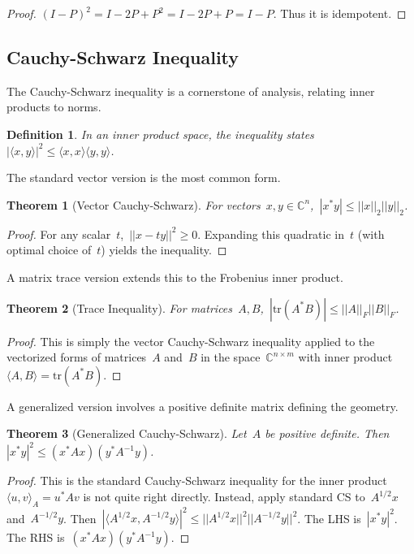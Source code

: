 \documentclass[12pt]{article}
\newtheorem{theorem}{Theorem}[section]
\newtheorem{definition}{Definition}[section]
\begin{document}
\begin{proof}
    $(I - P)^2 = I - 2P + P^2 = I - 2P + P = I - P$. Thus it is idempotent.
\end{proof}

\subsection{Cauchy-Schwarz Inequality}

The Cauchy-Schwarz inequality is a cornerstone of analysis, relating inner products to norms.

\begin{definition}
    In an inner product space, the inequality states~$|\langle x, y \rangle|^2 \le \langle x, x \rangle \langle y, y \rangle$.
\end{definition}

The standard vector version is the most common form.

\begin{theorem}[Vector Cauchy-Schwarz]
    For vectors~$x, y \in \mathbb{C}^n$,~$|x^* y| \le ||x||_2 ||y||_2$.
\end{theorem}

\begin{proof}
    For any scalar~$t$,~$||x - ty||^2 \ge 0$. Expanding this quadratic in~$t$ (with optimal choice of~$t$) yields the inequality.
\end{proof}

A matrix trace version extends this to the Frobenius inner product.

\begin{theorem}[Trace Inequality]
    For matrices~$A, B$,~$|\text{tr}(A^* B)| \le ||A||_F ||B||_F$.
\end{theorem}

\begin{proof}
    This is simply the vector Cauchy-Schwarz inequality applied to the vectorized forms of matrices~$A$ and~$B$ in the space~$\mathbb{C}^{n \times m}$ with inner product~$\langle A, B \rangle = \text{tr}(A^* B)$.
\end{proof}

A generalized version involves a positive definite matrix defining the geometry.

\begin{theorem}[Generalized Cauchy-Schwarz]
    Let~$A$ be positive definite. Then~$|x^* y|^2 \le (x^* A x) (y^* A^{-1} y)$.
\end{theorem}

\begin{proof}
    This is the standard Cauchy-Schwarz inequality for the inner product~$\langle u, v \rangle_A = u^* A v$ is not quite right directly. Instead, apply standard CS to~$A^{1/2} x$ and~$A^{-1/2} y$. Then~$|\langle A^{1/2} x, A^{-1/2} y \rangle|^2 \le ||A^{1/2} x||^2 ||A^{-1/2} y||^2$. The LHS is~$|x^* y|^2$. The RHS is~$(x^* A x)(y^* A^{-1} y)$.
\end{proof}
\end{document}
